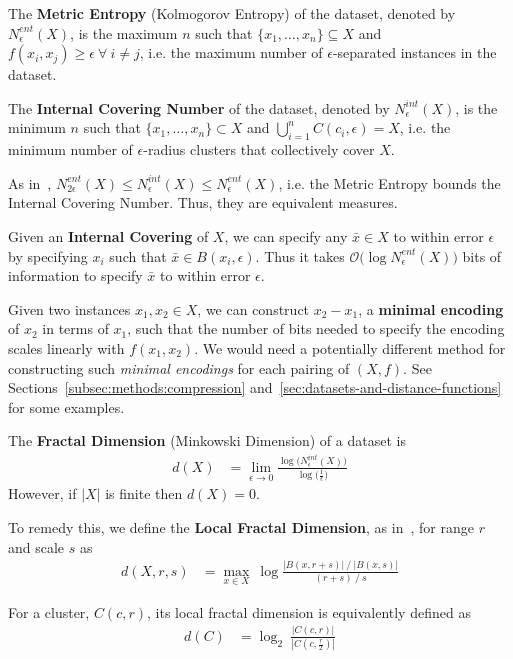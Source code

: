 The \textbf{Metric Entropy} (Kolmogorov Entropy) of the dataset, denoted by $N_{\epsilon}^{ent}(X)$, is the maximum $n$ such that $\{x_1, \dots, x_n\} \subseteq X$ and $f(x_i, x_j) \geq \epsilon \ \forall \ i \neq j$, i.e. the maximum number of $\epsilon$-separated instances in the dataset.

The \textbf{Internal Covering Number} of the dataset, denoted by $N_{\epsilon}^{int}(X)$, is the minimum $n$ such that $\{x_1, \dots, x_n\} \subset X$ and $\bigcup_{i = 1}^{n} C(c_i, \epsilon) = X$, i.e. the minimum number of $\epsilon$-radius clusters that collectively cover $X$.

As in~\cite{berger2020levenshtein}, $N_{2\epsilon}^{ent}(X) \leq N_{\epsilon}^{int}(X) \leq N_{\epsilon}^{ent}(X)$, i.e. the Metric Entropy bounds the Internal Covering Number.
Thus, they are equivalent measures.

Given an \textbf{Internal Covering} of $X$, we can specify any $\bar{x} \in X$ to within error $\epsilon$ by specifying $x_i$ such that $\bar{x} \in B(x_i, \epsilon)$.
Thus it takes $\mathcal{O} \big( \log N_{\epsilon}^{ent}(X) \big)$ bits of information to specify $\bar{x}$ to within error $\epsilon$.

Given two instances $x_1, x_2 \in X$, we can construct $x_2 - x_1$, a \textbf{minimal encoding} of $x_2$ in terms of $x_1$, such that the number of bits needed to specify the encoding scales linearly with $f(x_1, x_2)$.
We would need a potentially different method for constructing such \textit{minimal encodings} for each pairing of $(X, f)$.
See Sections~\ref{subsec:methods:compression} and~\ref{sec:datasets-and-distance-functions} for some examples.

The \textbf{Fractal Dimension} (Minkowski Dimension) of a dataset is
\begin{align*}
    d(X) &= \lim_{\epsilon \rightarrow 0} \frac{\log \big( N_{\epsilon}^{int}(X) \big) }{\log \big( \frac{1}{\epsilon} \big)}
\end{align*}
However, if $|X|$ is finite then $d(X) = 0$.

To remedy this, we define the \textbf{Local Fractal Dimension}, as in~\cite{berger2020levenshtein}, for range $r$ and scale $s$ as
\begin{align*}
    d(X, r, s) &= \max_{x \in X} \ \log \frac{|B(x, r + s)| \ / \ |B(x, s)|}{(r + s) \ / \ s}
\end{align*}

For a cluster, $C(c, r)$, its local fractal dimension is equivalently defined as
\begin{align}
    \label{eq:local-fractal-dimension}
    d(C) &= \log_2 \ \frac{|C(c, r)|}{|C(c, \frac{r}{2})|}
\end{align}

